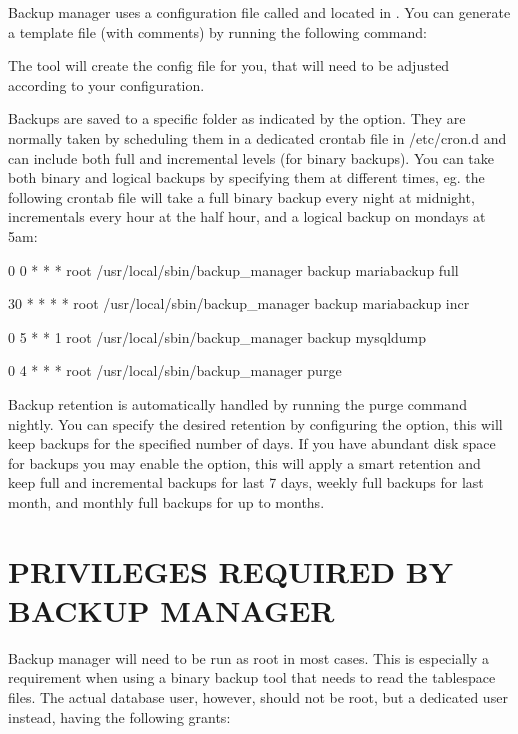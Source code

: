\documentclass[letterpaper,10pt,english]{sphinxmanual}
\begin{document}
Backup manager uses a configuration file called  and located
in . You can generate a template file (with comments) by running
the following command:


The tool will create the config file for you, that will need to be adjusted
according to your configuration.

Backups are saved to a specific folder as indicated by the  option.
They are normally taken by scheduling them in a dedicated crontab file in /etc/cron.d
and can include both full and incremental levels (for binary backups). You can take
both binary and logical backups by specifying them at different times, eg. the
following crontab file will take a full binary backup every night at midnight,
incrementals every hour at the half hour, and a logical backup on mondays at 5am:

0 0 * * * root /usr/local/sbin/backup\_manager backup mariabackup full

30 * * * * root /usr/local/sbin/backup\_manager backup mariabackup incr

0 5 * * 1 root /usr/local/sbin/backup\_manager backup mysqldump

0 4 * * * root /usr/local/sbin/backup\_manager purge

Backup retention is automatically handled by running the purge command nightly.
You can specify the desired retention by configuring the  option, this will
keep backups for the specified number of days. If you have abundant disk space for
backups you may enable the  option, this will apply a smart retention
and keep full and incremental backups for last 7 days, weekly full backups for
last month, and monthly full backups for up to  months.


\section{PRIVILEGES REQUIRED BY BACKUP MANAGER}
\label{\detokenize{mariadb-backup-manager:privileges-required-by-backup-manager}}
Backup manager will need to be run as root in most cases. This is especially a
requirement when using a binary backup tool that needs to read the tablespace files.
The actual database user, however, should not be root, but a dedicated user instead,
having the following grants:
\end{document}
